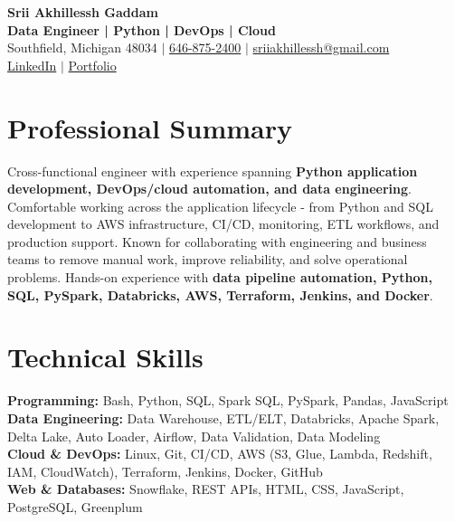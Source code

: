 \documentclass[letterpaper,10pt]{article}
\begin{document}
\fontsize{9.35pt}{10.45pt}\selectfont

\begin{center}
    {\LARGE \textbf{Srii Akhillessh Gaddam}} \\[-1pt]
    \textbf{Data Engineer | Python | DevOps | Cloud} \\[2pt]
    Southfield, Michigan 48034 $|$
    \href{tel:6468752400}{646-875-2400} $|$
    \href{mailto:sriiakhillessh@gmail.com}{sriiakhillessh@gmail.com} \\[1pt]
    \href{https://www.linkedin.com/in/srii-akhiilessh-gaddam-b48668191/}{LinkedIn} $|$
    \href{https://sriiakhillesshg.github.io/portfolio/}{Portfolio}
\end{center}
\vspace{-8pt}

\section{Professional Summary}
\small{Cross-functional engineer with experience spanning \textbf{Python application development, DevOps/cloud automation, and data engineering}. Comfortable working across the application lifecycle - from Python and SQL development to AWS infrastructure, CI/CD, monitoring, ETL workflows, and production support. Known for collaborating with engineering and business teams to remove manual work, improve reliability, and solve operational problems. Hands-on experience with \textbf{data pipeline automation, Python, SQL, PySpark, Databricks, AWS, Terraform, Jenkins, and Docker}.}

\section{Technical Skills}
\small{
\textbf{Programming:} Bash, Python, SQL, Spark SQL, PySpark, Pandas, JavaScript \\
\textbf{Data Engineering:} Data Warehouse, ETL/ELT, Databricks, Apache Spark, Delta Lake, Auto Loader, Airflow, Data Validation, Data Modeling \\
\textbf{Cloud \& DevOps:} Linux, Git, CI/CD, AWS (S3, Glue, Lambda, Redshift, IAM, CloudWatch), Terraform, Jenkins, Docker, GitHub \\
\textbf{Web \& Databases:} Snowflake, REST APIs, HTML, CSS, JavaScript, PostgreSQL, Greenplum
}
\end{document}
